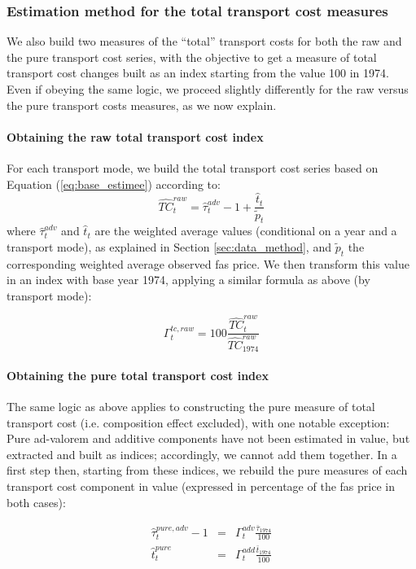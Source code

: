 \documentclass[a4paper,11pt]{article}
\begin{document}
\subsubsection{Estimation method for the total transport cost measures}

We also build two measures of the ``total'' transport costs for both the raw and the pure transport cost series, with the objective to get a measure of total transport cost changes built as an index starting from the value 100 in 1974. Even if obeying the same logic, we proceed slightly differently for the raw versus the pure transport costs measures, as we now explain.
\smallskip

\paragraph{Obtaining the raw total transport cost index} For each transport mode, we build the total transport cost series based on Equation (\ref{eq:base_estimee}) according to:
$$\widehat{TC}^{raw}_t= \widehat{\tau}^{adv}_t -1 + \frac{\widehat{t}_t}{\widetilde{p}_t}$$
\noindent where $\widehat{\tau}^{adv}_t$ and $\widehat{t}_t$ are the weighted average values (conditional on a year and a transport mode), as explained in Section \ref{sec:data_method}, and $\widetilde{p}_t$ the corresponding weighted average observed fas price.
We then transform this value in an index with base year 1974, applying a similar formula as above (by transport mode):

$$\Gamma^{tc, raw}_t = 100\frac{\widehat{TC}^{raw}_t  }{\widehat{TC}^{raw}_{1974}}$$



\paragraph{Obtaining the pure total transport cost index} The same logic as above applies to constructing the pure measure of total transport cost (i.e. composition effect excluded), with one notable exception: Pure ad-valorem and additive components have not been estimated in value, but extracted and built as indices; accordingly, we cannot add them together. In a first step then, starting from these indices, we rebuild the pure measures of each transport cost component in value (expressed in percentage of the fas price in both cases):

\begin{eqnarray*}
\widehat{\tau}^{pure, adv}_t -1 &=&\Gamma^{adv}_t \frac{\bar{\tau}_{1974} }{100} \\
\widehat{t}^{pure}_t &=& \Gamma^{add}_t\frac{\bar{t}_{1974}}{100}
\end{eqnarray*}
\end{document}
